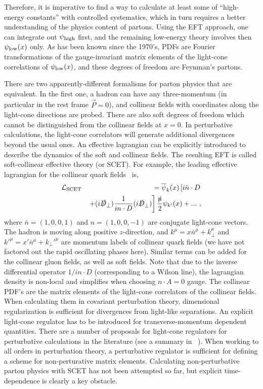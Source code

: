 \documentclass[prd,aps,twocolumn,preprintnumbers,showpacs,nofootinbib,superscriptaddress,notitlepage]{revtex4-1}
\begin{document}
Therefore, it is imperative to find a way to calculate at least some of ``high-energy constants'' with controlled systematics, which in turn requires a better understanding of the physics content of partons. Using the EFT approach, one can integrate out $\psi_{\rm high}$ first, and the remaining low-energy theory involves then $\psi_{\rm low}(x)$ only. As has been known since the 1970's, PDFs are Fourier transformations of the gauge-invariant matrix elements of the light-cone correlations of $\psi_{\rm low}(x)$, and these degrees of freedom are Feynman's partons. 

There are two apparently-different formalisms for parton physics that are equivalent. In the first one, a hadron can have any three-momentum (in particular in the rest frame $\vec{P}=0$), and collinear fields with coordinates along the light-cone directions are probed. There are also soft degrees of freedom which cannot be distinguished 
from the collinear fields at $x=0$. In perturbative calculations, the light-cone correlators will generate additional divergences beyond the usual ones. An effective lagrangian can be explicitly
introduced to describe the dynamics of the soft and collinear fields. The resulting EFT is called soft-collinear effective theory (or SCET). For example, the leading effective lagrangian for the collinear quark fields~\cite{Bauer:2000ew,Bauer:2000yr} is, 
\begin{eqnarray}
{\cal L}_{\rm SCET} &&= \overline {\psi}_{k}(x) \left[i\bar{n}\cdot D \right. \nonumber 
\\ && \left. + (i\slashed{D}_\perp) \frac{1}{{in\cdot D}}  (i\slashed{ D}_\perp ) \right] \frac{\slashed{n}}{2}\psi_{k'}(x) + ... \ , 
\end{eqnarray}
where ${\bar n}=(1,0,0,1)$ and $n=(1,0,0,-1)$ are conjugate light-cone vectors. The hadron is moving along positive $z$-direction, and $k^\mu=x{\bar n}^\mu + k_\perp^\mu $ and $k'^\mu=x' \bar{n}^\mu + k_\perp '^\mu $ are momentum labels of collinear quark fields (we have not factored out the rapid oscillating phases here). Similar terms can be added for the collinear gluon fields, as well as soft fields. 
Note that due to the inverse differential operator $1/in\cdot D$  (corresponding to a Wilson line), the lagrangian density is non-local and simplifies when choosing $n \cdot A=0$ gauge.
The collinear PDF's are the matrix elements of the light-cone correlators of the collinear fields. When calculating them in covariant perturbation theory, dimensional regularization is sufficient for divergences from light-like separations. An explicit light-cone regulator has to be introduced for transverse-momentum dependent quantities. There are a number of proposals for light-cone regulators for perturbative calculations in the literature (see a summary in ~\cite{Ebert:2019okf}).  When working to all orders in perturbation theory, 
a perturbative regulator is sufficient for defining a scheme for non-perturative matrix elements.  
Calculating non-perturbative parton physics with SCET has not been attempted so far, but explicit time-dependence is clearly a key obstacle.
\end{document}
